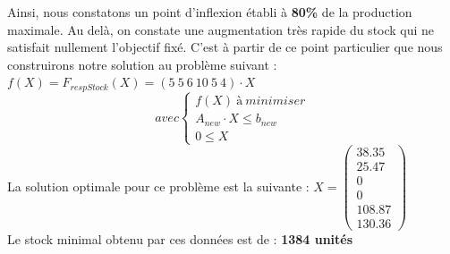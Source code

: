 \documentclass[a4paper, 11pt]{article}
\begin{document}
Ainsi, nous constatons un point d'inflexion établi à \textbf{80\%} de la production maximale. Au delà, on constate une augmentation très rapide du stock qui ne satisfait nullement l'objectif fixé.
C'est à partir de ce point particulier que nous construirons notre solution au problème suivant :
$f(X) = F_{respStock} (X) =(5~5~6~10~5~4)\cdot X$ \\
$$
avec \left\{\begin{split}
	f(X)\ à\ minimiser\\
    A_{new}\cdot X \leq b_{new}\\
    0 \leq X
\end{split}\right.
$$
La solution optimale pour ce problème est la suivante :
$ X =\begin{pmatrix}
38.35\\
25.47\\
0\\
0\\
108.87\\
130.36
\end{pmatrix} $\\
Le stock minimal obtenu par ces données est de : \textbf{1384 unités}
\end{document}
